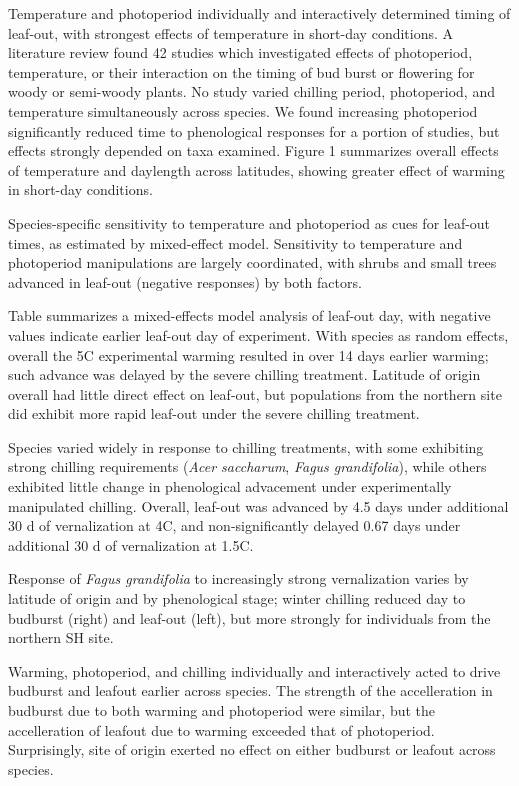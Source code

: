 \documentclass[11pt]{article}
\begin{document}
Temperature and photoperiod individually and interactively determined timing of leaf-out, with strongest effects of temperature in short-day conditions. A literature review found 42 studies which investigated effects of photoperiod, temperature, or their interaction on the timing of bud burst or flowering for woody or semi-woody plants.  No study varied chilling period, photoperiod, and temperature simultaneously across species. We found increasing photoperiod significantly reduced time to phenological responses for a portion of studies, but effects strongly depended on taxa examined. Figure 1 summarizes overall effects of temperature and daylength across latitudes, showing greater effect of warming in short-day conditions.

Species-specific sensitivity to temperature and photoperiod as cues for leaf-out times, as estimated by mixed-effect model. Sensitivity to temperature and photoperiod manipulations are largely coordinated, with shrubs and small trees advanced in leaf-out (negative responses) by both factors.

Table  summarizes a mixed-effects model analysis of leaf-out day, with negative values indicate earlier leaf-out day of experiment. With species as random effects, overall the 5\degree C experimental warming resulted in over 14 days earlier warming; such advance was delayed by the severe chilling treatment. Latitude of origin overall had little direct effect on leaf-out, but populations from the northern site did exhibit more rapid leaf-out under the severe chilling treatment.

Species varied widely in response to chilling treatments, with some exhibiting strong chilling requirements (\emph{Acer saccharum}, \emph{Fagus grandifolia}), while others exhibited little change in phenological advacement under experimentally manipulated chilling. Overall, leaf-out was advanced by 4.5 days under additional 30 d of vernalization at 4\degree C, and non-significantly delayed 0.67 days under additional 30 d of vernalization at 1.5\degree C.

Response of \emph{Fagus grandifolia} to increasingly strong vernalization varies by latitude of origin and by phenological stage; winter chilling reduced day to budburst (right) and leaf-out (left), but more strongly for individuals from the northern SH site.



Warming, photoperiod, and chilling individually and interactively acted to drive budburst  and leafout earlier across species. The strength of the accelleration in budburst due to both warming and photoperiod were similar, but the accelleration of leafout due to warming exceeded that of photoperiod. Surprisingly, site of origin exerted no effect on either budburst or leafout across species.
\end{document}
